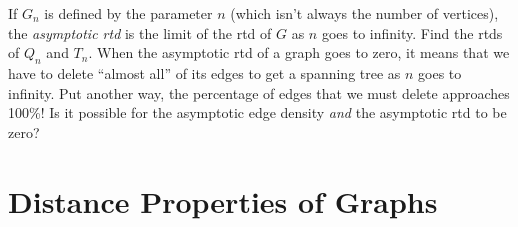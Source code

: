 \documentclass{article}
\begin{document}
\begin{description}
  If $G_n$ is defined by the parameter $n$ (which isn't always the number of vertices), the \emph{asymptotic rtd} is the limit of the rtd of $G$ as $n$ goes to infinity. Find the rtds of $Q_n$ and $T_n$. When the asymptotic rtd of a graph goes to zero, it means that we have to delete ``almost all'' of its edges to get a spanning tree as $n$ goes to infinity. Put another way, the percentage of edges that we must delete approaches 100\%! Is it possible for the asymptotic edge density \emph{and} the asymptotic rtd to be zero?

\end{description}




\newpage

\section{Distance Properties of Graphs}
\end{document}
